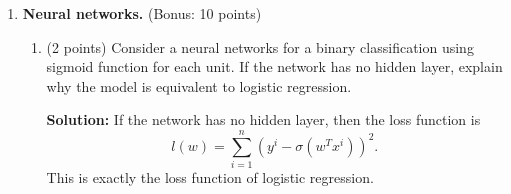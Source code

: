 \documentclass[twoside,10pt]{article}
\begin{document}
\begin{enumerate}
\begin{enumerate}
\begin{tcolorbox}
\end{tcolorbox}
\end{enumerate}


\item {\bf Neural networks.} (Bonus: 10 points)

\begin{enumerate}
\item (2 points)
Consider a neural networks for a binary classification using sigmoid function for each unit. If the network has no hidden layer, explain why the model is equivalent to logistic regression. 
\begin{tcolorbox}
\textbf{Solution:} If the network has no hidden layer, then the loss function is $$l(w) = \sum_{i=1}^n (y^i - \sigma(w^Tx^i))^2.$$ This is exactly the loss function of logistic regression. 
\end{tcolorbox}


\end{enumerate}
\end{enumerate}
\end{document}
